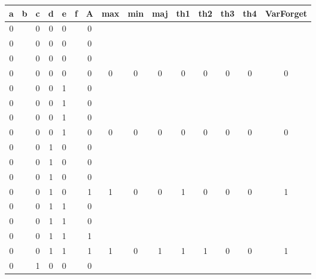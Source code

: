 \begin{table}[!tb]
    \centering
    \begin{tabular}{|c|c|c|c|c|c|c|c|c|c|c|c|c|c|c|}
        \hline
        \textbf{a} & \textbf{b} & \textbf{c} & \textbf{d} & \textbf{e} & \textbf{f} & \textbf{A} & \textbf{max} & \textbf{min} & \textbf{maj} & \textbf{th1} & \textbf{th2} & \textbf{th3} & \textbf{th4} & \textbf{VarForget} \\ \hline
        \rowcolor{gray!40} 0 &  & 0 & 0 & 0 &  & 0 &  &  &  &  &  &  &  &  \\ \hline
        \rowcolor{gray!40} 0 &  & 0 & 0 & 0 &  & 0 &  &  &  &  &  &  &  &  \\ \hline
        \rowcolor{gray!40} 0 &  & 0 & 0 & 0 &  & 0 &  &  &  &  &  &  &  &  \\ \hline
        \rowcolor{gray!40} 0 &  & 0 & 0 & 0 &  & 0 & 0 & 0 & 0 & 0 & 0 & 0 & 0 & 0 \\ \hline
        \rowcolor{blue!40} 0 &  & 0 & 0 & 1 &  & 0 &  &  &  &  &  &  &  &  \\ \hline
        \rowcolor{blue!40} 0 &  & 0 & 0 & 1 &  & 0 &  &  &  &  &  &  &  &  \\ \hline
        \rowcolor{blue!40} 0 &  & 0 & 0 & 1 &  & 0 &  &  &  &  &  &  &  &  \\ \hline
        \rowcolor{blue!40} 0 &  & 0 & 0 & 1 &  & 0 & 0 & 0 & 0 & 0 & 0 & 0 & 0 & 0 \\ \hline
        \rowcolor{red!40} 0 &  & 0 & 1 & 0 &  & 0 &  &  &  &  &  &  &  &  \\ \hline
        \rowcolor{red!40} 0 &  & 0 & 1 & 0 &  & 0 &  &  &  &  &  &  &  &  \\ \hline
        \rowcolor{red!40} 0 &  & 0 & 1 & 0 &  & 0 &  &  &  &  &  &  &  &  \\ \hline
        \rowcolor{red!40} 0 &  & 0 & 1 & 0 &  & 1 & 1 & 0 & 0 & 1 & 0 & 0 & 0 & 1 \\ \hline
        \rowcolor{green!40} 0 &  & 0 & 1 & 1 &  & 0 &  &  &  &  &  &  &  &  \\ \hline
        \rowcolor{green!40} 0 &  & 0 & 1 & 1 &  & 0 &  &  &  &  &  &  &  &  \\ \hline
        \rowcolor{green!40} 0 &  & 0 & 1 & 1 &  & 1 &  &  &  &  &  &  &  &  \\ \hline
        \rowcolor{green!40} 0 &  & 0 & 1 & 1 &  & 1 & 1 & 0 & 1 & 1 & 1 & 0 & 0 & 1 \\ \hline
        \rowcolor{yellow!40} 0 &  & 1 & 0 & 0 &  & 0 &  &  &  &  &  &  &  &  \\ \hline

\end{tabular}
\end{table}
